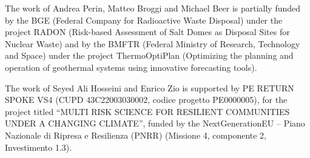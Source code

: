 
The work of Andrea Perin, Matteo Broggi and Michael Beer is partially funded by the BGE (Federal Company for Radioactive Waste Disposal) under the project RADON (Risk-based Assessment of Salt Domes as Disposal Sites for Nuclear Waste) and by the BMFTR (Federal Ministry of Research, Technology and Space) under the project ThermoOptiPlan (Optimizing the planning and operation of geothermal systems using innovative forecasting tools).

The work of Seyed Ali Hosseini and Enrico Zio is supported by PE RETURN SPOKE VS4 (CUPD 43C22003030002, codice progetto PE0000005), for the project titled “MULTI RISK SCIENCE FOR RESILIENT COMMUNITIES UNDER A CHANGING CLIMATE”, funded by the NextGenerationEU – Piano Nazionale di Ripresa e Resilienza (PNRR) (Missione 4, componente 2, Investimento 1.3). 